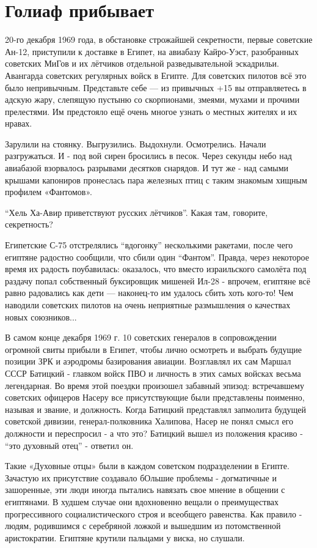 \section{Голиаф прибывает}

20-го декабря 1969 года, в обстановке строжайшей секретности, первые советские Ан-12, приступили к доставке в Египет, на авиабазу Кайро-Уэст, разобранных советских МиГов и их лётчиков отдельной разведывательной эскадрильи. Авангарда советских регулярных войск в Египте. Для советских пилотов всё это было непривычным. Представьте себе — из привычных +15 вы отправляетесь в адскую жару, слепящую пустыню со скорпионами, змеями, мухами и прочими прелестями. Им предстояло ещё очень многое узнать о местных жителях и их нравах.

Зарулили на стоянку. Выгрузились. Выдохнули. Осмотрелись. Начали разгружаться. И - под вой сирен бросились в песок. Через секунды небо над авиабазой взорвалось разрывами десятков снарядов. И тут же - над самыми крышами капониров пронеслась пара железных птиц с таким знакомым хищным профилем «Фантомов».

“Хель Ха-Авир приветствуют русских лётчиков”. Какая там, говорите, секретность?

Египетские С-75 отстрелялись “вдогонку” несколькими ракетами, после чего египтяне радостно сообщили, что сбили один “Фантом”. Правда, через некоторое время их радость поубавилась: оказалось, что вместо израильского самолёта под раздачу попал собственный буксировщик мишеней Ил-28 - впрочем, египтяне всё равно радовались как дети — наконец-то им удалось сбить хоть кого-то! Чем наводили советских пилотов на очень неприятные размышления о качествах новых союзников...

В самом конце декабря 1969 г. 10 советских генералов в сопровождении огромной свиты прибыли в Египет, чтобы лично осмотреть и выбрать будущие позиции ЗРК и аэродромы базирования авиации. Возглавлял их сам Маршал СССР Батицкий - главком войск ПВО и личность в этих самых войсках весьма легендарная. Во время этой поездки произошел забавный эпизод: встречавшему советских офицеров Насеру все присутствующие были представлены поименно, называя и звание, и должность. Когда Батицкий представлял запмолита будущей советской дивизии, генерал-полковника Халипова, Насер не понял смысл его должности и переспросил - а что это? Батицкий вышел из положения красиво - “это духовный отец” - ответил он.

Такие «Духовные отцы» были в каждом советском подразделении в Египте. Зачастую их присутствие создавало бОльшие проблемы - догматичные и зашоренные, эти люди иногда пытались навязать свое мнение в общении с египтянами. В худшем случае они вдохновенно вещали о преимуществах прогрессивного социалистического строя и всеобщего равенства. Как правило - людям, родившимся с серебряной ложкой и вышедшим из потомственной аристократии. Египтяне крутили пальцами у виска, но слушали.

